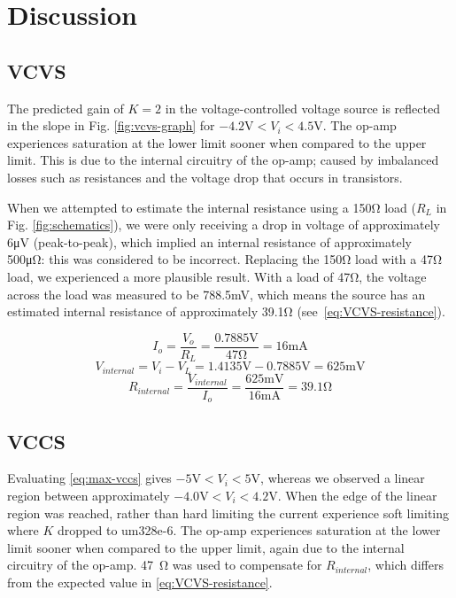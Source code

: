 \section{Discussion}\label{sec:discussion}
\subsection{VCVS}

The predicted gain of $K=2$ in the voltage-controlled voltage source is reflected in the slope in Fig.
\ref{fig:vcvs-graph} for $-4.2\si{\volt}<V_i<4.5\si{\volt}$.
The op-amp experiences saturation at the lower limit sooner when compared to the upper limit.
This is due to the internal circuitry of the op-amp; caused by imbalanced losses such as resistances and the voltage drop that occurs in transistors.

When we attempted to estimate the internal resistance using a 150\si{\ohm} load ($R_L$ in Fig.
\ref{fig:schematics}), we were only receiving a drop in voltage of approximately 6\si{\micro\volt} (peak-to-peak), which implied an internal resistance of approximately 500\si{\micro\ohm}: this was considered to be incorrect.
Replacing the 150\si{\ohm} load with a 47\si{\ohm} load, we experienced a more plausible result.
With a load of 47\si{\ohm}, the voltage across the load was measured to be 788.5\si{\milli\volt}, which means the source has an estimated internal resistance of approximately 39.1\si{\ohm} (see~\eqref{eq:VCVS-resistance}).

\begin{equation*}
I_o	= \frac{V_o}{R_L} = \frac{0.7885\si{\volt}}{47\si{\ohm}} = 16\si{\milli\ampere}
\end{equation*}
\begin{equation*}
V_{internal}		= V_i - V_L = 1.4135\si{\volt} - 0.7885\si{\volt} = 625\si{\milli\volt}
\end{equation*}
\begin{equation}
\label{eq:VCVS-resistance}
R_{internal}	= \frac{V_{internal}}{I_o} = \frac{625\si{\milli\volt}}{16\si{\milli\ampere}} = 39.1\si{\ohm}
\end{equation}

\subsection{VCCS}

Evaluating \eqref{eq:max-vccs} gives $-5\si{\volt} < V_i < 5\si{\volt}$, whereas we observed a linear region between approximately $-4.0\si{\volt}<V_i<4.2\si{\volt}$.
When the edge of the linear region was reached, rather than hard limiting the current experience soft limiting where $K$ dropped to 
um{328e-6}.
The op-amp experiences saturation at the lower limit sooner when compared to the upper limit, again due to the internal circuitry of the op-amp.
\SI{47}{\ohm} was used to compensate for $R_{internal}$, which differs from the expected value in \eqref{eq:VCVS-resistance}.


